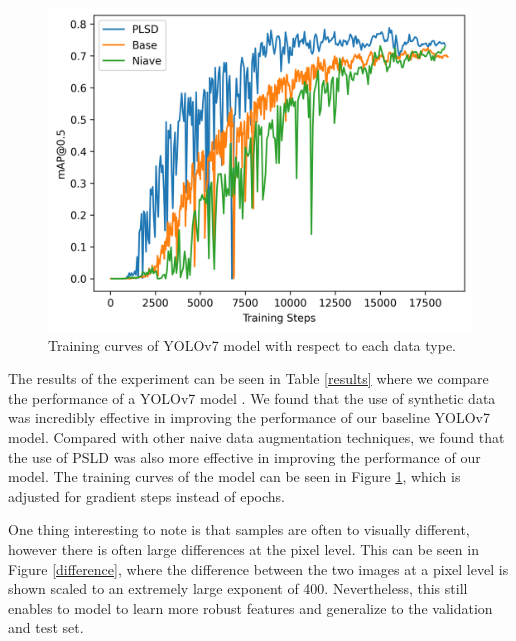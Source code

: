 \documentclass{article}
\begin{document}
\begin{figure}[ht]
    \vskip -0.1in
    \begin{center}
        \centerline{\includegraphics[width=\columnwidth]{training.png}}
        \caption{Training curves of YOLOv7 model with respect to each data type.}
        \label{training_curves}
    \end{center}
    \vskip -0.3in
\end{figure}


The results of the experiment can be seen in Table \ref{results} where we compare the performance of a YOLOv7 model \cite{wang2023yolov7}. We found that 
the use of synthetic data was incredibly effective in improving the performance of our baseline YOLOv7 model. Compared with other naive data augmentation techniques,
we found that the use of PSLD was also more effective in improving the performance of our model. The training curves of the model can be seen in 
Figure \ref{training_curves}, which is adjusted for gradient steps instead of epochs.

One thing interesting to note is that samples are often to visually different, however there is often large differences at the pixel level.
This can be seen in Figure \ref{difference}, where the difference between the two images at a pixel level is shown scaled to an extremely large exponent of 400.
Nevertheless, this still enables to model to learn more robust features and generalize to the validation and test set.
\end{document}
